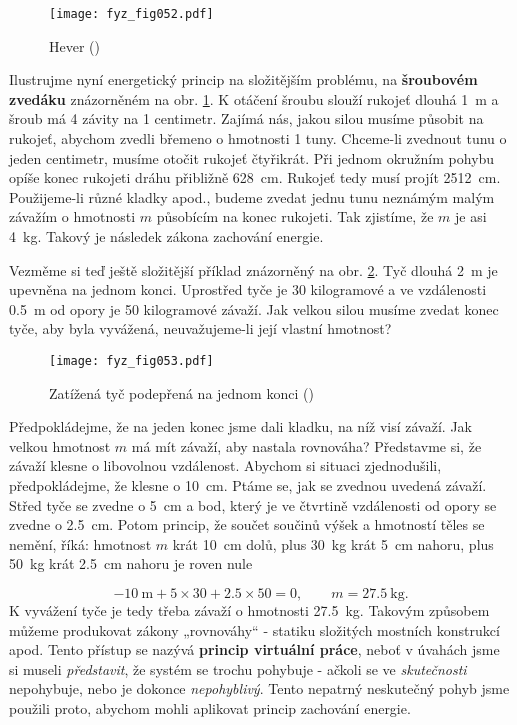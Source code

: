     \begin{figure}[ht!]  %
      \centering
      \texttt{[image: fyz\_fig052.pdf]}
      \caption{Hever (\cite[s.~55]{Feynman01})}
      \label{fyz:fig052}
    \end{figure}
    Ilustrujme nyní energetický princip na složitějším problému, na \textbf{šroubovém zvedáku} 
    znázorněném na obr. \ref{fyz:fig052}. K otáčení šroubu slouží rukojeť dlouhá \SI{1}{\m} a šroub 
    má \num{4} závity na \num{1} centimetr. Zajímá nás, jakou silou musíme působit na rukojeť, 
    abychom zvedli břemeno o hmotnosti \num{1} tuny. Chceme-li zvednout tunu o jeden centimetr, 
    musíme otočit rukojeť čtyřikrát. Při jednom okružním pohybu opíše konec rukojeti dráhu 
    přibližně \SI{628}{\cm}. Rukojeť tedy musí projít \SI{2512}{\cm}. Použijeme-li různé kladky 
    apod., budeme zvedat jednu tunu neznámým malým závažím o hmotnosti \(m\) působícím na konec 
    rukojeti. Tak zjistíme, že \(m\) je asi \SI{4}{\kg}. Takový je následek zákona zachování 
    energie.

    Vezměme si teď ještě složitější příklad znázorněný na obr. \ref{fyz:fig053}. Tyč dlouhá 
    \SI{2}{\m} je upevněna na jednom konci. Uprostřed tyče je \num{30} kilogramové a ve vzdálenosti 
    \SI{0.5}{\m} od opory je \num{50} kilogramové závaží. Jak velkou silou musíme zvedat konec 
    tyče, aby byla vyvážená, neuvažujeme-li její vlastní hmotnost?
    
    \begin{figure}[ht!]  %
      \centering
      \texttt{[image: fyz\_fig053.pdf]}
      \caption{Zatížená tyč podepřená na jednom konci (\cite[s.~56]{Feynman01})}
      \label{fyz:fig053}
    \end{figure}
    
    Předpokládejme, že na jeden konec jsme dali kladku, na níž visí závaží. Jak velkou hmotnost 
    \(m\) má mít závaží, aby nastala rovnováha? Představme si, že závaží klesne o libovolnou 
    vzdálenost. Abychom si situaci zjednodušili, předpokládejme, že klesne o \SI{10}{cm}. Ptáme se, 
    jak se zvednou uvedená závaží. Střed tyče se zvedne o \SI{5}{\cm} a bod, který je ve čtvrtině 
    vzdálenosti od opory se zvedne o \SI{2.5}{\cm}. Potom princip, že součet součinů výšek a 
    hmotností těles se nemění, říká: hmotnost \(m\) krát \SI{10}{\cm} dolů, plus \SI{30}{\kg} krát 
    \SI{5}{\cm} nahoru, plus \SI{50}{\kg} krát \SI{2.5}{\cm} nahoru je roven nule
    
    \begin{equation*}
       -\SI{10}{\m} + \num{5}\times\num{30} + \num{2.5}\times\num{50} = \num{0}, 
       \qquad m = \SI{27.5}{\kg}.
    \end{equation*}
    K vyvážení tyče je tedy třeba závaží o hmotnosti \SI{27.5}{\kg}. Takovým způsobem můžeme 
    produkovat zákony „rovnováhy“ - statiku složitých mostních konstrukcí apod. Tento přístup se 
    nazývá \textbf{princip virtuální práce}, neboť v úvahách jsme si museli \emph{představit}, že 
    systém se trochu pohybuje - ačkoli se ve \emph{skutečnosti} nepohybuje, nebo je dokonce 
    \emph{nepohyblivý}. Tento nepatrný neskutečný pohyb jsme použili proto, abychom mohli aplikovat 
    princip zachování energie.

